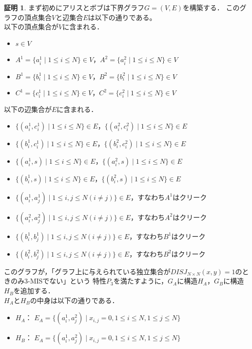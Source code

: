 \documentclass[12pt]{thesis}
\theoremstyle{definition}
\newtheorem*{prf*}{証明}
\begin{document}
\begin{prf*}
まず初めにアリスとボブは下界グラフ$G = (V, E)$を構築する．
このグラフの頂点集合$V$と辺集合$E$は以下の通りである。 \\
以下の頂点集合が$V$に含まれる．
\begin{itemize}
\item $s \in V$
\item $A^{1} = \{a^{1}_{i} \mid 1\leq i \leq N\}  \in V$，$A^{2} = \{a^{2}_{i} \mid 1\leq i \leq N\} \in V$
\item $B^{1} = \{b^{1}_{i} \mid 1\leq i \leq N\}  \in V$，$B^{2} = \{b^{2}_{i} \mid 1\leq i \leq N\} \in V$
\item $C^{1} = \{c^{1}_{i} \mid 1\leq i \leq N\}  \in V$，$C^{2} = \{c^{2}_{i} \mid 1\leq i \leq N\} \in V$
\end{itemize}
以下の辺集合が$E$に含まれる．
\begin{itemize}
\item $\{(a^{1}_{i}, c^{1}_{i}) \mid 1\leq i \leq N\} \in E$，$\{(a^{2}_{i}, c^{2}_{i}) \mid 1\leq i \leq N\} \in E$
\item $\{(b^{1}_{i}, c^{1}_{i}) \mid 1\leq i \leq N\} \in E$，$\{(b^{2}_{i}, c^{2}_{i}) \mid 1\leq i \leq N\} \in E$
\item $\{(a^{1}_{i}, s) \mid 1\leq i \leq N\} \in E$，$\{(a^{2}_{i}, s) \mid 1\leq i \leq N\} \in E$
\item $\{(b^{1}_{i}, s) \mid 1\leq i \leq N\} \in E$，$\{(b^{2}_{i}, s) \mid 1\leq i \leq N\} \in E$
\item $\{(a^{1}_{i}, a^{1}_{j}) \mid 1\leq i,j \leq N(i \neq j)\} \in E$，すなわち$A^{1}$はクリーク
\item $\{(a^{2}_{i}, a^{2}_{j}) \mid 1\leq i,j \leq N(i \neq j)\} \in E$，すなわち$A^{2}$はクリーク
\item $\{(b^{1}_{i}, b^{1}_{j}) \mid 1\leq i,j \leq N(i \neq j)\} \in E$，すなわち$B^{1}$はクリーク
\item $\{(b^{2}_{i}, b^{2}_{j}) \mid 1\leq i,j \leq N(i \neq j)\} \in E$，すなわち$B^{2}$はクリーク
\end{itemize}
このグラフが，「グラフ上に与えられている独立集合が$DISJ_{N \times N} (x, y) = 1$のときのみ3-MISでない」という
特性$P_{3}$を満たすように，$G_{A}$に構造$H_{A}$，$G_{B}$に構造$H_{B}$を追加する．\\
$H_{A}$と$H_{B}$の中身は以下の通りである．
\begin{itemize}
\item $H_{A}$： $E_{A}=\{(a^{1}_{i},a^{2}_{j}) \mid x_{i,j}=0, 1 \leq i \leq N, 1 \leq j \leq N\}$
\item $H_{B}$： $E_{A}=\{(a^{1}_{i},a^{2}_{j}) \mid x_{i,j}=0, 1 \leq i \leq N, 1 \leq j \leq N\}$
\end{itemize}


\end{prf*}
\end{document}
